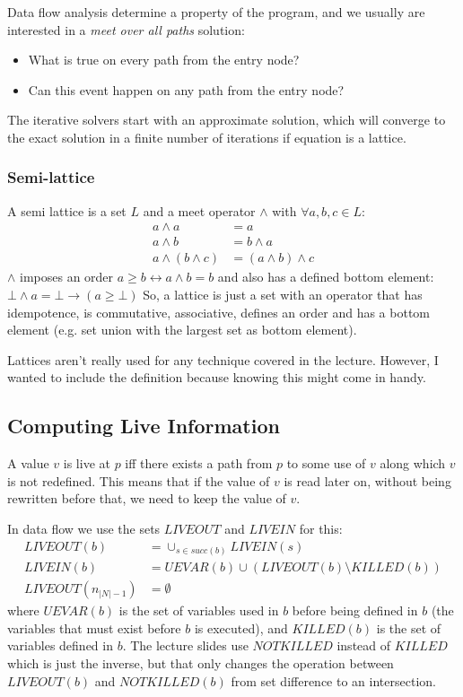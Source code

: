 \documentclass{article}
\begin{document}
Data flow analysis determine a property of the program, and we usually are interested in a \emph{meet over all paths} solution:
\begin{itemize}
	\item What is true on every path from the entry node?
	\item Can this event happen on any path from the entry node?
\end{itemize}
The iterative solvers start with an approximate solution, which will converge to the exact solution in a finite number of iterations if equation is a lattice.

\subsubsection{Semi-lattice}
A semi lattice is a set $L$ and a meet operator $\wedge$ with $\forall a,b,c \in L$:
\begin{align}
	a \wedge a &= a\\
	a \wedge b &= b \wedge a\\
	a \wedge (b \wedge c) &= (a \wedge b) \wedge c
\end{align}
$\wedge$ imposes an order $a \geq b \leftrightarrow a \wedge b = b$ and also has a defined bottom element: $\bot \wedge a = \bot \rightarrow (a \geq \bot)$
So, a lattice is just a set with an operator that has idempotence, is commutative, associative, defines an order and has a bottom element (e.g. set union with the largest set as bottom element).

Lattices aren't really used for any technique covered in the lecture.
However, I wanted to include the definition because knowing this might come in handy.

\subsection{Computing Live Information}
A value $v$ is live at $p$ iff there exists a path from $p$ to some use of $v$ along which $v$ is not redefined.
This means that if the value of $v$ is read later on, without being rewritten before that, we need to keep the value of $v$.

In data flow we use the sets $LIVEOUT$ and $LIVEIN$ for this:
\begin{align}
	LIVEOUT(b) &= \cup_{s \in succ(b)} LIVEIN(s)\\
	LIVEIN(b) &= UEVAR(b) \cup (LIVEOUT(b) \setminus KILLED(b))\\
	LIVEOUT(n_{|N|-1}) &= \emptyset
\end{align}
where $UEVAR(b)$ is the set of variables used in $b$ before being defined in $b$ (the variables that must exist before $b$ is executed), and $KILLED(b)$ is the set of variables defined in $b$.
The lecture slides use $NOTKILLED$ instead of $KILLED$ which is just the inverse, but that only changes the operation between $LIVEOUT(b)$ and $NOTKILLED(b)$ from set difference to an intersection.
\end{document}
